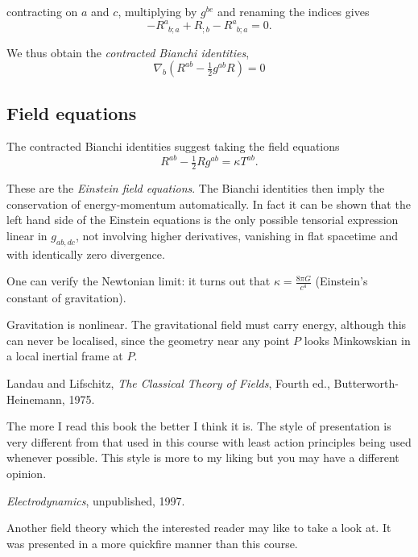 \documentclass{notes}
\begin{document}
contracting on $a$ and $c$, multiplying by $g^{b e}$ and
renaming the indices gives
\[
-R^a_{\phantom{a} b; a} + R_{; b} - R^a_{\phantom{a}b;
 a} = 0.
\]

We thus obtain the \emph{contracted Bianchi identities},
\[
\nabla_b\left(R^{a b} - \tfrac{1}{2} g^{a b} R \right) = 0
\]

\subsection{Field equations}

The contracted Bianchi identities suggest taking the field equations
\[
R^{a b} - \tfrac{1}{2} R g^{a b} = \kappa T^{a b}.
\]

These are the \emph{Einstein field equations}.  The Bianchi identities
then imply the conservation of energy-momentum automatically.  In
fact it can be shown that the left hand side of the Einstein equations
is the only possible tensorial expression linear in $g_{a b,d
  c}$, not involving higher derivatives, vanishing in flat
spacetime and with identically zero divergence.

One can verify the Newtonian limit: it turns out that $\kappa =
\frac{8 \pi G}{c^4}$ (Einstein's constant of gravitation).

Gravitation is nonlinear.  The gravitational field must carry energy,
although this can never be localised, since the geometry near any
point $P$ looks Minkowskian in a local inertial frame at $P$.

\backmatter

\begin{thebibliography}{9}

 Landau and Lifschitz, \emph{The Classical Theory of
    Fields}, Fourth ed., Butterworth-Heinemann, 1975.
  
  {\sffamily \small The more I read this book the better I think it
    is.  The style of presentation is very different from that used in
    this course with least action principles being used whenever
    possible.  This style is more to my liking but you may have
    a different opinion.}

 \emph{Electrodynamics}, unpublished, 1997.
  
  {\sffamily \small Another field theory which the interested reader
    may like to take a look at.  It was presented in a more quickfire
    manner than this course.}

\end{thebibliography}
\end{document}
